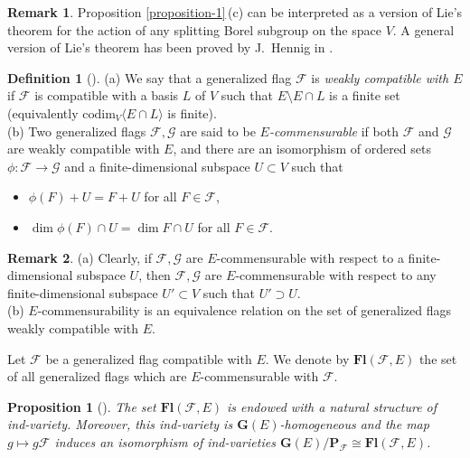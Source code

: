 \documentclass[12pt]{amsart}
\newtheorem{proposition}{Proposition}
\theoremstyle{definition}
\newtheorem{remark}{Remark}
\newtheorem{definition}{Definition}
\begin{document}
\begin{remark}
Proposition \ref{proposition-1}\,{\rm (c)} can be interpreted as a version of Lie's theorem for the action of any splitting Borel subgroup on the space $V$. A general version of Lie's theorem has been proved by J.~Hennig in \cite{Hennig}.
\end{remark}

\begin{definition}[\cite{DP}]
\label{definition-3-new}
{\rm (a)}
We say that a generalized flag $\mathcal{F}$ is {\it weakly compatible with $E$} if $\mathcal{F}$ is compatible with a basis $L$ of $V$ such that $E\setminus E\cap L$ is a finite set (equivalently $\mathrm{codim}_V\langle E\cap L\rangle$ is finite). \\
{\rm (b)}
Two generalized flags $\mathcal{F},\mathcal{G}$ are said to be {\it $E$-commensurable} if both $\mathcal{F}$ and $\mathcal{G}$ are weakly compatible with $E$, and
there are an isomorphism of ordered sets
$\phi:\mathcal{F}\to\mathcal{G}$ and a finite-dimensional subspace $U\subset V$ such that
\begin{itemize}
\item[{\rm (i)}] $\phi(F)+U=F+U$ for all $F\in\mathcal{F}$,
\item[{\rm (ii)}] $\dim \phi(F)\cap U=\dim F\cap U$ for all $F\in\mathcal{F}$.
\end{itemize}
\end{definition}

\begin{remark}
{\rm (a)} Clearly, if $\mathcal{F},\mathcal{G}$ are $E$-commensurable with respect to a finite-dimensional subspace $U$, then $\mathcal{F},\mathcal{G}$ are $E$-commensurable with respect to any finite-dimensional subspace $U'\subset V$ such that $U'\supset U$. \\
{\rm (b)} $E$-commensurability is an equivalence relation on the set of generalized flags weakly compatible with $E$.
\end{remark}

Let $\mathcal{F}$ be a generalized flag compatible with $E$.
We denote by $\mathbf{Fl}(\mathcal{F},E)$ the set of all generalized flags which are $E$-commensurable with $\mathcal{F}$.

\begin{proposition}[\cite{DP}]
\label{proposition-2}
The set $\mathbf{Fl}(\mathcal{F},E)$
is endowed with a natural structure of ind-variety.
Moreover, this ind-variety is $\mathbf{G}(E)$-homogeneous and the
map $g\mapsto g\mathcal{F}$ induces
an isomorphism of ind-varieties $\mathbf{G}(E)/\mathbf{P}_\mathcal{F}\cong \mathbf{Fl}(\mathcal{F},E)$.

\end{proposition}
\end{document}
